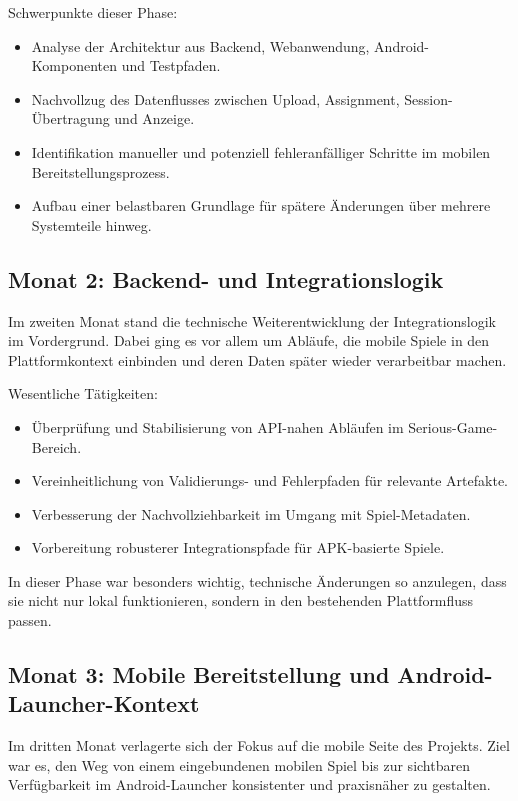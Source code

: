 \documentclass[12pt,a4paper]{article}
\begin{document}
Schwerpunkte dieser Phase:
\begin{itemize}[leftmargin=1.5em]
  \item Analyse der Architektur aus Backend, Webanwendung, Android-Komponenten und Testpfaden.
  \item Nachvollzug des Datenflusses zwischen Upload, Assignment, Session-Übertragung und Anzeige.
  \item Identifikation manueller und potenziell fehleranfälliger Schritte im mobilen Bereitstellungsprozess.
  \item Aufbau einer belastbaren Grundlage für spätere Änderungen über mehrere Systemteile hinweg.
\end{itemize}

\subsection{Monat 2: Backend- und Integrationslogik}
Im zweiten Monat stand die technische Weiterentwicklung der Integrationslogik im Vordergrund. Dabei ging es vor allem um Abläufe, die mobile Spiele in den Plattformkontext einbinden und deren Daten später wieder verarbeitbar machen.

Wesentliche Tätigkeiten:
\begin{itemize}[leftmargin=1.5em]
  \item Überprüfung und Stabilisierung von API-nahen Abläufen im Serious-Game-Bereich.
  \item Vereinheitlichung von Validierungs- und Fehlerpfaden für relevante Artefakte.
  \item Verbesserung der Nachvollziehbarkeit im Umgang mit Spiel-Metadaten.
  \item Vorbereitung robusterer Integrationspfade für APK-basierte Spiele.
\end{itemize}

In dieser Phase war besonders wichtig, technische Änderungen so anzulegen, dass sie nicht nur lokal funktionieren, sondern in den bestehenden Plattformfluss passen.

\subsection{Monat 3: Mobile Bereitstellung und Android-Launcher-Kontext}
Im dritten Monat verlagerte sich der Fokus auf die mobile Seite des Projekts. Ziel war es, den Weg von einem eingebundenen mobilen Spiel bis zur sichtbaren Verfügbarkeit im Android-Launcher konsistenter und praxisnäher zu gestalten.
\end{document}
